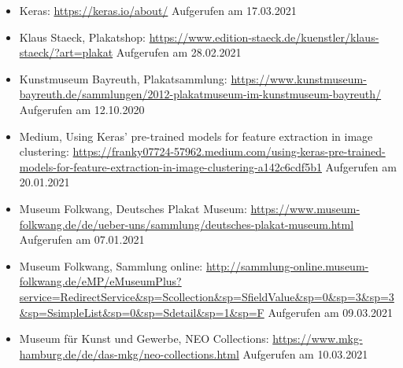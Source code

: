 \documentclass[a4paper,12pt,ngerman]{article}
\begin{document}
\begin{itemize}
\item Keras: \newline \href{https://keras.io/about/}{https://keras.io/about/} \newline Aufgerufen am 17.03.2021
\item Klaus Staeck, Plakatshop: \newline \href{https://www.edition-staeck.de/kuenstler/klaus-staeck/?art=plakat}{https://www.edition-staeck.de/kuenstler/klaus-staeck/?art=plakat} \newline Aufgerufen am 28.02.2021
\item Kunstmuseum Bayreuth, Plakatsammlung: \newline \href{https://www.kunstmuseum-bayreuth.de/sammlungen/2012-plakatmuseum-im-kunstmuseum-bayreuth/}{https://www.kunstmuseum-bayreuth.de/sammlungen/2012-plakatmuseum-im-kunstmuseum-bayreuth/} \newline Aufgerufen am 12.10.2020
\item Medium, Using Keras' pre-trained models for feature extraction in image clustering: \newline \href{https://franky07724-57962.medium.com/using-keras-pre-trained-models-for-feature-extraction-in-image-clustering-a142c6cdf5b1}{https://franky07724-57962.medium.com/using-keras-pre-trained-models-for-feature-extraction-in-image-clustering-a142c6cdf5b1} \newline Aufgerufen am 20.01.2021
\item Museum Folkwang, Deutsches Plakat Museum: \newline \href{https://www.museum-folkwang.de/de/ueber-uns/sammlung/deutsches-plakat-museum.html}{https://www.museum-folkwang.de/de/ueber-uns/sammlung/deutsches-plakat-museum.html} \newline Aufgerufen am 07.01.2021
\item Museum Folkwang, Sammlung online: \newline \href{http://sammlung-online.museum-folkwang.de/eMP/eMuseumPlus?service=RedirectService\&sp=Scollection\&sp=SfieldValue\&sp=0\&sp=3\&sp=3\&sp=SsimpleList\&sp=0\&sp=Sdetail\&sp=1\&sp=F}{http://sammlung-online.museum-folkwang.de/eMP/eMuseumPlus?service=\newline RedirectService\&sp=Scollection\&sp=SfieldValue\&sp=0\&sp=3\&sp=3\&sp=\newline SsimpleList\&sp=0\&sp=Sdetail\&sp=1\&sp=F} \newline Aufgerufen am 09.03.2021
\item Museum für Kunst und Gewerbe, NEO Collections: \newline \href{https://www.mkg-hamburg.de/de/das-mkg/neo-collections.html}{https://www.mkg-hamburg.de/de/das-mkg/neo-collections.html} \newline Aufgerufen am 10.03.2021

\end{itemize}
\end{document}
